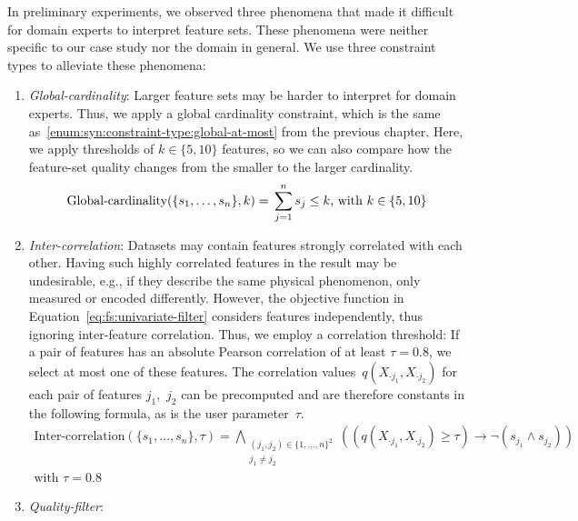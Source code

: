 In preliminary experiments, we observed three phenomena that made it difficult for domain experts to interpret feature sets.
These phenomena were neither specific to our case study nor the domain in general.
We use three constraint types to alleviate these phenomena:
%
\begin{enumerate}[label=(I\arabic*), wide]
	\item\label{enum:ms:constraint-type:global-cardinality} \emph{Global-cardinality}:
	Larger feature sets may be harder to interpret for domain experts.
	Thus, we apply a global cardinality constraint, which is the same as~\ref{enum:syn:constraint-type:global-at-most} from the previous chapter.
	Here, we apply thresholds of $k \in \{5, 10\}$ features, so we can also compare how the feature-set quality changes from the smaller to the larger cardinality.
	\begin{equation}
		\text{Global-cardinality}(\{s_1, \dots, s_n\}, k) =\\
		\sum_{j=1}^{n} s_j \leq k \text{, with } k \in \{5,10\}
		\label{eq:ms:constraint:global-cardinalty}
	\end{equation}
	\item\label{enum:ms:constraint-type:inter-correlation} \emph{Inter-correlation}:
	Datasets may contain features strongly correlated with each other.
	Having such highly correlated features in the result may be undesirable, e.g., if they describe the same physical phenomenon, only measured or encoded differently.
	However, the objective function in Equation~\ref{eq:fs:univariate-filter} considers features independently, thus ignoring inter-feature correlation.
	Thus, we employ a correlation threshold:
	If a pair of features has an absolute Pearson correlation of at least $\tau = 0.8$, we select at most one of these features.
	The correlation values~$q(X_{\cdot{}j_1},X_{\cdot{}j_2})$ for each pair of features $j_1$,~$j_2$ can be precomputed and are therefore constants in the following formula, as is the user parameter~$\tau$.
	\begin{multline}
		\text{Inter-correlation}(\{s_1, \dots, s_n\}, \tau) = \bigwedge_{\substack{(j_1, j_2) \in \{1, \dots, n\}^2 \\ j_1 \neq j_2}} \left( \left( q(X_{\cdot{}j_1},X_{\cdot{}j_2}) \geq \tau \right) \rightarrow \lnot (s_{j_1} \land s_{j_2}) \right)\\
		\text{with } \tau = 0.8
		\label{eq:ms:constraint:inter-correlation}
	\end{multline}
	\item\label{enum:ms:constraint-type:quality-filter} \emph{Quality-filter}:

\end{enumerate}
